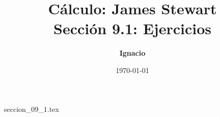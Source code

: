 \documentclass[11pt,spanish,oneside]{report}
\title{\textbf{Cálculo: James Stewart} \\ \Large Sección 9.1: Ejercicios}
\author{\textbf{Ignacio}}
\date{\today}
\begin{document}
\maketitle

{seccion_09_1.tex}
\end{document}
